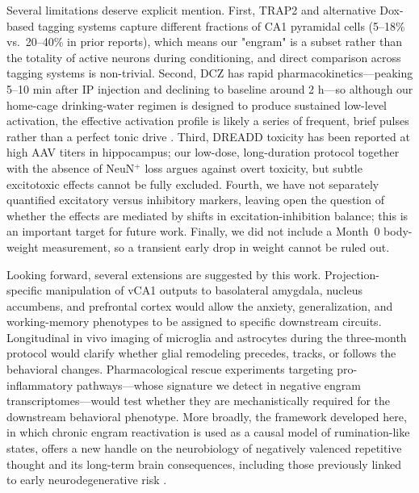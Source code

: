 \documentclass[11pt]{article}
\begin{document}
Several limitations deserve explicit mention. First, TRAP2 and alternative Dox-based tagging systems capture different fractions of CA1 pyramidal cells (5--18\% vs.\ 20--40\% in prior reports), which means our "engram" is a subset rather than the totality of active neurons during conditioning, and direct comparison across tagging systems is non-trivial. Second, DCZ has rapid pharmacokinetics---peaking 5--10 min after IP injection and declining to baseline around 2 h---so although our home-cage drinking-water regimen is designed to produce sustained low-level activation, the effective activation profile is likely a series of frequent, brief pulses rather than a perfect tonic drive \citep{nagai2020dcz}. Third, DREADD toxicity has been reported at high AAV titers in hippocampus; our low-dose, long-duration protocol together with the absence of NeuN$^{+}$ loss argues against overt toxicity, but subtle excitotoxic effects cannot be fully excluded. Fourth, we have not separately quantified excitatory versus inhibitory markers, leaving open the question of whether the effects are mediated by shifts in excitation-inhibition balance; this is an important target for future work. Finally, we did not include a Month~0 body-weight measurement, so a transient early drop in weight cannot be ruled out.

Looking forward, several extensions are suggested by this work. Projection-specific manipulation of vCA1 outputs to basolateral amygdala, nucleus accumbens, and prefrontal cortex \citep{ciocchi2015vca1} would allow the anxiety, generalization, and working-memory phenotypes to be assigned to specific downstream circuits. Longitudinal in vivo imaging of microglia and astrocytes during the three-month protocol would clarify whether glial remodeling precedes, tracks, or follows the behavioral changes. Pharmacological rescue experiments targeting pro-inflammatory pathways---whose signature we detect in negative engram transcriptomes---would test whether they are mechanistically required for the downstream behavioral phenotype. More broadly, the framework developed here, in which chronic engram reactivation is used as a causal model of rumination-like states, offers a new handle on the neurobiology of negatively valenced repetitive thought and its long-term brain consequences, including those previously linked to early neurodegenerative risk \citep{marchant2020rnt}.



\end{document}
